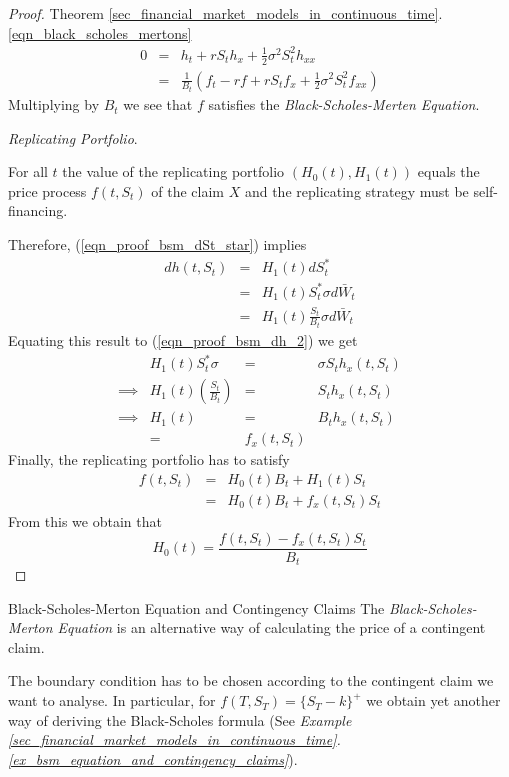 \documentclass[11pt,a4paper]{article}
\begin{document}
\begin{proof}{Theorem \ref{sec_financial_market_models_in_continuous_time}.\ref{eqn_black_scholes_mertons}}
\[\begin{array}{rcl}
      0&=&h_t+rS_th_x+\frac12\sigma^2S_t^2h_{xx}\\
      &=&\frac1{B_t}\left(f_t-rf+rS_tf_x+\frac12\sigma^2S_t^2f_{xx}\right)
    \end{array}\]
    Multiplying by $B_t$ we see that $f$ satisfies the \textit{Black-Scholes-Merten Equation}.\proved
    \par \textit{Replicating Portfolio}.
    \par For all $t$ the value of the replicating portfolio $\left(H_0(t),H_1(t)\right)$ equals the price process $f(t,S_t)$ of the claim $X$ and the replicating strategy must be self-financing.
    \par Therefore, (\ref{eqn_proof_bsm_dSt_star}) implies
    \[\begin{array}{rcl}
      dh(t,S_t)&=&H_1(t)dS_t^*\\
      &=&H_1(t)S_t^*\sigma d\bar{W}_t\\
      &=&H_1(t)\frac{S_t}{B_t}\sigma d\bar{W}_t
    \end{array}\]
    Equating this result to (\ref{eqn_proof_bsm_dh_2}) we get
    \[\begin{array}{rrcl}
      &H_1(t)S_t^*\sigma&=&\sigma S_th_x(t,S_t)\\
      \implies&H_1(t)\left(\frac{S_t}{B_t}\right)&=&S_th_x(t,S_t)\\
      \implies&H_1(t)&=&B_th_x(t,S_t)\\
      &=&f_x(t,S_t)
    \end{array}\]
    Finally, the replicating portfolio has to satisfy
    \[\begin{array}{rcl}
      f(t,S_t)&=&H_0(t)B_t+H_1(t)S_t\\
      &=&H_0(t)B_t+f_x(t,S_t)S_t
    \end{array}\]
    From this we obtain that
    \[ H_0(t)=\frac{f(t,S_t)-f_x(t,S_t)S_t}{B_t} \]
  \end{proof}

  \begin{remark}{Black-Scholes-Merton Equation and Contingency Claims}
    The \textit{Black-Scholes-Merton Equation} is an alternative way of calculating the price of a contingent claim.
    \par The boundary condition has to be chosen according to the contingent claim we want to analyse. In particular, for $f(T,S_T)=\{S_T-k\}^+$ we obtain yet another way of deriving the Black-Scholes formula (See \textit{Example \ref{sec_financial_market_models_in_continuous_time}.\ref{ex_bsm_equation_and_contingency_claims}}).
  \end{remark}
\end{document}
